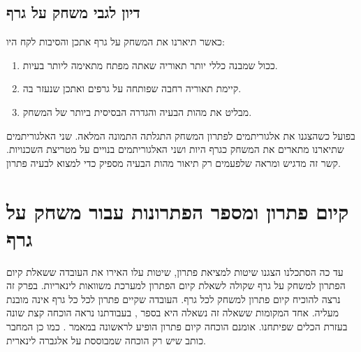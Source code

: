 \documentclass[12pt,leqno]{article}
\theoremstyle{theoremdd}
\begin{document}
\subsection{דיון לגבי משחק על גרף}
כאשר תיארנו את המשחק על גרף אתכן 
והסיבות לקח היו:
\begin{enumerate}
    \item 
    ככול שמבנה כללי יותר תאוריה שאתה מפתח מתאימה ליותר בעיות.
    \item 
    קיימת תאוריה רחבה שפותחה על גרפים ואתכן שנעזר בה.
    \item 
    מבליט את מהות הבעיה והגדרה הבסיסית ביותר של המשחק.
\end{enumerate}
בפועל כשהצגנו את אלגוריתמים לפתרון המשחק 
התגלתה התמונה המלאה.
שני האלגוריתמים שתיארנו מתארים את המשחק כגרף היות ושני האלגוריתמים בנויים על מטריצת השכנויות.
קשר זה מדגיש ומראה שלפעמים רק תיאור מהות הבעיה מספיק כדי למצוא לבעיה פתרון.

\section{קיום פתרון ומספר הפתרונות עבור משחק על גרף}
עד כה הסתכלנו הצגנו שיטות למציאת פתרון,
שיטות עלו האירו את העובדה
ששאלת קיום הפתרון למשחק על גרף שקולה לשאלת קיום הפתרון למערכת
משוואות לינאריות.
בפרק זה נרצה להוכיח קיום פתרון למשחק לכל גרף.
העובדה שקיים פתרון לכל כל גרף אינה מובנת מעליה.
אחד המקומות ששאלה זה נשאלה היא בספר 
\cite{B3},
בעבודתנו נראה הוכחה קצת שונה בעזרת הכלים שפיתחנו.
אומנם הוכחה קיום פתרון הופיע לראשונה במאמר 
\cite{Sutner}.
כמו כן המחבר כותב שיש רק הוכחה שמבוססת על אלגברה לינארית.
\end{document}
